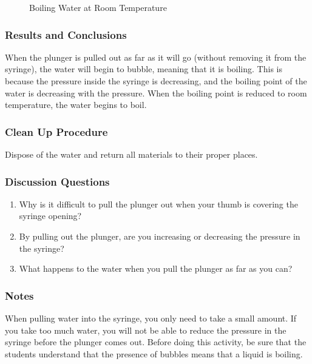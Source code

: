 \begin{figure}
\begin{center}
\def\svgwidth{150pt}

\caption{Boiling Water at Room Temperature}
\label{fig:boiling-room-temp}
\end{center}
\end{figure}

\subsubsection*{Results and Conclusions}
When the plunger is pulled out as far as it will go (without removing it from the syringe), the water will begin to bubble, meaning that it is boiling. This is because the pressure inside the syringe is decreasing, and the boiling point of the water is decreasing with the pressure. When the boiling point is reduced to room temperature, the water begins to boil.  

\subsubsection*{Clean Up Procedure}
Dispose of the water and return all materials to their proper places.

\subsubsection*{Discussion Questions}
\begin{enumerate}
\item{Why is it difficult to pull the plunger out when your thumb is covering the syringe opening?}
\item{By pulling out the plunger, are you increasing or decreasing the pressure in the syringe?}
\item{What happens to the water when you pull the plunger as far as you can?}
\end{enumerate}

\subsubsection*{Notes}
When pulling water into the syringe, you only need to take a small amount. If you take too much water, you will not be able to reduce the pressure in the syringe before the plunger comes out.  
Before doing this activity, be sure that the students understand that the presence of bubbles means that a liquid is boiling.
